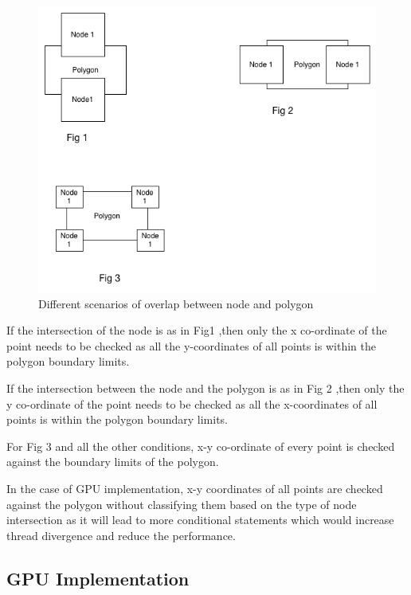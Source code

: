 \documentclass{article}
\begin{document}
\begin{figure}[H]
\caption{Different scenarios of overlap between node and polygon}
\includegraphics[scale=0.5]{OverlapScenario}
\end{figure}

If the intersection of the node is as in Fig1 ,then only the x co-ordinate of the point needs to be checked as all the y-coordinates of all points is within the polygon boundary limits.

If the intersection between the node and the polygon is as in Fig 2 ,then only the y co-ordinate of the point needs to be checked as all the x-coordinates of all points is within the polygon boundary limits.

For Fig 3 and all the other conditions, x-y co-ordinate of every point is checked against the boundary limits of the polygon.

In the case of GPU implementation, x-y coordinates of all points are checked against the polygon without classifying them based on the type of node intersection as it will lead to more conditional statements which would increase thread divergence and reduce the performance.



\subsection{GPU Implementation}
\end{document}
